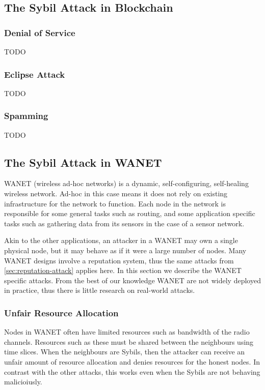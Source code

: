 
\subsection{The Sybil Attack in Blockchain}

\subsubsection{Denial of Service}
TODO~\cite{vasek2014empirical}

\subsubsection{Eclipse Attack}
TODO~\cite{heilman2015eclipse}

\subsubsection{Spamming}
TODO~\cite{bitcoinspam}

\subsection{The Sybil Attack in WANET}
WANET (wireless ad-hoc networks) is a dynamic, self-configuring, self-healing
wireless network. Ad-hoc in this case means it does not rely on existing
infrastructure for the network to function. Each node in the network is
responsible for some general tasks such as routing, and some application
specific tasks such as gathering data from its sensors in the case of a sensor
network.

Akin to the other applications, an attacker in a WANET may own a single physical
node, but it may behave as if it were a large number of nodes. Many WANET
designs involve a reputation system\cite{ganeriwal2008reputation,
  buchegger2003robust}, thus the same attacks from
\autoref{sec:reputation-attack} applies here. In this section we describe the
WANET specific attacks. From the best of our knowledge WANET are not widely
deployed in practice, thus there is little research on real-world attacks.

\subsubsection{Unfair Resource Allocation}
Nodes in WANET often have limited resources such as bandwidth of the radio
channels. Resources such as these must be shared between the neighbours using
time slices. When the neighbours are Sybils, then the attacker can receive an
unfair amount of resource allocation and denies resources for the honest
nodes\cite{newsome2004sybil}. In contrast with the other attacks, this works
even when the Sybils are not behaving malicioiusly.


